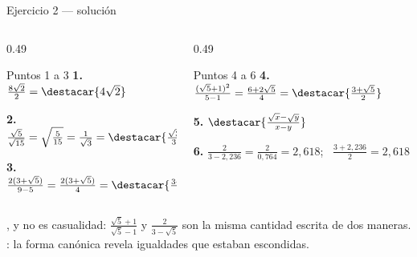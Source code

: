 \documentclass[aspectratio=169,10pt]{beamer}
\begin{document}
\begin{frame}{Ejercicio 2 — solución}
  \scriptsize
  \begin{columns}[T,onlytextwidth]
    \begin{column}{0.49\textwidth}
      \begin{block}{Puntos 1 a 3}
        \tiny
        \textbf{1.} $\tfrac{8\sqrt2}{2} = \destacar{4\sqrt{2}}$

        \vspace{0.08cm}
        \textbf{2.} $\tfrac{\sqrt5}{\sqrt{15}}
        = \sqrt{\tfrac{5}{15}} = \tfrac{1}{\sqrt3}
        = \destacar{\tfrac{\sqrt{3}}{3}}$

        \vspace{0.08cm}
        \textbf{3.} $\tfrac{2(3+\sqrt5)}{9-5}
        = \tfrac{2(3+\sqrt5)}{4}
        = \destacar{\tfrac{3+\sqrt{5}}{2}}$
      \end{block}
    \end{column}
    \begin{column}{0.49\textwidth}
      \begin{block}{Puntos 4 a 6}
        \tiny
        \textbf{4.} $\tfrac{(\sqrt5+1)^{2}}{5-1}
        = \tfrac{6+2\sqrt5}{4}
        = \destacar{\tfrac{3+\sqrt{5}}{2}}$

        \vspace{0.08cm}
        \textbf{5.} $\destacar{\tfrac{\sqrt{x}-\sqrt{y}}{x-y}}$

        \vspace{0.08cm}
        \textbf{6.} $\tfrac{2}{3-2{,}236} = \tfrac{2}{0{,}764}
        = 2{,}618$; \ $\tfrac{3+2{,}236}{2} = 2{,}618$ \checkmark
      \end{block}
    \end{column}
  \end{columns}

  \vspace{0.08cm}
  {\tiny\color{uniGris} , y no es
  casualidad: $\tfrac{\sqrt5+1}{\sqrt5-1}$ y $\tfrac{2}{3-\sqrt5}$ son la
  misma cantidad escrita de dos maneras. : la forma canónica revela igualdades que estaban
  escondidas.}
\end{frame}
\end{document}
